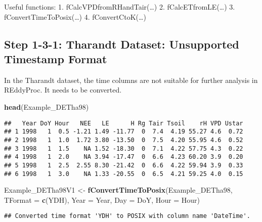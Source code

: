 \documentclass[
]{article}
\newenvironment{Shaded}{\begin{snugshade}}{\end{snugshade}}
\newcommand{\AttributeTok}[1]{\textcolor[rgb]{0.13,0.29,0.53}{#1}}
\newcommand{\FunctionTok}[1]{\textcolor[rgb]{0.13,0.29,0.53}{\textbf{#1}}}
\newcommand{\NormalTok}[1]{#1}
\newcommand{\OtherTok}[1]{\textcolor[rgb]{0.56,0.35,0.01}{#1}}
\newcommand{\StringTok}[1]{\textcolor[rgb]{0.31,0.60,0.02}{#1}}
\begin{document}
Useful functions: 1. fCalcVPDfromRHandTair(\ldots) 2.
fCalcETfromLE(\ldots) 3. fConvertTimeToPosix(\ldots) 4.
fConvertCtoK(\ldots)

\hypertarget{step-1-3-1-tharandt-dataset-unsupported-timestamp-format}{%
\subsection{Step 1-3-1: Tharandt Dataset: Unsupported Timestamp
Format}\label{step-1-3-1-tharandt-dataset-unsupported-timestamp-format}}

In the Tharandt dataset, the time columns are not suitable for further
analysis in REddyProc. It needs to be converted.

\begin{Shaded}
\begin{Highlighting}[]
\FunctionTok{head}\NormalTok{(Example\_DETha98)}
\end{Highlighting}
\end{Shaded}

\begin{verbatim}
##   Year DoY Hour   NEE   LE      H Rg Tair Tsoil    rH VPD Ustar
## 1 1998   1  0.5 -1.21 1.49 -11.77  0  7.4  4.19 55.27 4.6  0.72
## 2 1998   1  1.0  1.72 3.80 -13.50  0  7.5  4.20 55.95 4.6  0.52
## 3 1998   1  1.5    NA 1.52 -18.30  0  7.1  4.22 57.75 4.3  0.22
## 4 1998   1  2.0    NA 3.94 -17.47  0  6.6  4.23 60.20 3.9  0.20
## 5 1998   1  2.5  2.55 8.30 -21.42  0  6.6  4.22 59.94 3.9  0.33
## 6 1998   1  3.0    NA 1.33 -20.55  0  6.5  4.21 59.25 4.0  0.15
\end{verbatim}

\begin{Shaded}
\begin{Highlighting}[]
\NormalTok{Example\_DETha98V1 }\OtherTok{\textless{}{-}} \FunctionTok{fConvertTimeToPosix}\NormalTok{(Example\_DETha98, }\AttributeTok{TFormat =} \FunctionTok{c}\NormalTok{(}\StringTok{\textquotesingle{}YDH\textquotesingle{}}\NormalTok{),}
                    \AttributeTok{Year =} \StringTok{\textquotesingle{}Year\textquotesingle{}}\NormalTok{,}
                    \AttributeTok{Day =} \StringTok{\textquotesingle{}DoY\textquotesingle{}}\NormalTok{, }
                    \AttributeTok{Hour =} \StringTok{\textquotesingle{}Hour\textquotesingle{}}\NormalTok{)}
\end{Highlighting}
\end{Shaded}

\begin{verbatim}
## Converted time format 'YDH' to POSIX with column name 'DateTime'.
\end{verbatim}
\end{document}
